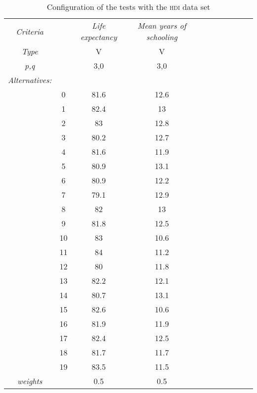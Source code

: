 \begin{table}[h]
    \centering
    \begin{tabular}{C @{\hskip 1cm}C C C C C C C C C C}
    \toprule
    \textit{Criteria}     &   & \textit{Life expectancy}   &  \textit{Mean years of schooling} \\
    \textit{Type}         &   &         V                  & V    \\
    \textit{p,q}          &   &         3,0                &  3,0 \\
    \midrule
    \textit{Alternatives:} \\

                          & 0 &         81.6               &      12.6                \\
                          & 1 &         82.4               &      13 \\  
                          & 2 &         83                 &      12.8 \\  
                          & 3 &         80.2                &     12.7  \\  
                          & 4 &         81.6               &      11.9 \\  
                          & 5 &         80.9               &      13.1 \\  
                          & 6 &         80.9               &      12.2 \\  
                          & 7 &         79.1               &   12.9    \\  
                          & 8 &         82                 &   13    \\  
                          & 9 &         81.8               &   12.5    \\  
                          & 10&        83                  &   10.6    \\  
                          & 11&        84                  & 11.2      \\  
                          & 12&        80                  & 11.8  \\  
                          & 13&        82.2                & 12.1      \\  
                          & 14&        80.7                & 13.1      \\  
                          & 15&        82.6                & 10.6  \\  
                          & 16&        81.9                & 11.9  \\  
                          & 17&        82.4                & 12.5  \\  
                          & 18&        81.7                & 11.7  \\  
                          & 19&        83.5                & 11.5  \\  
    \midrule
    \textit{weights}      &   &        0.5                 & 0.5  \\
    \bottomrule
    \end{tabular}
    \captionsetup{width=10cm}
    \caption{Configuration of the tests with the \textsc{hdi} data set}
    \label{tbl:hdi_parameters}
\end{table}

